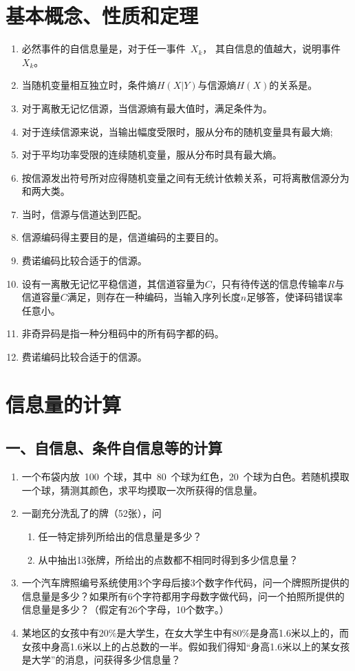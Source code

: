 \documentclass[normal,cyan]{elegantnote}
\newcommand{\nl}{\underline{\makebox[2em]{}}}
\begin{document}
\section*{基本概念、性质和定理}
\begin{enumerate}
    \item 必然事件的自信息量是\nl，对于任一事件~$X_k$， 其自信息的值越大，说明事件
    $X_k$\nl。
    \item 当随机变量相互独立时，条件熵$H(X|Y)$与信源熵$H(X)$的关系是\nl。
    \item 对于离散无记忆信源，当信源熵有最大值时，满足条件为\nl。
    \item 对于连续信源来说，当输出幅度受限时，服从\nl 分布的随机变量具有最大熵; 
    \item 对于平均功率受限的连续随机变量，服从\nl 分布时具有最大熵。
    \item 按信源发出符号所对应得随机变量之间有无统计依赖关系，可将离散信源分为\nl 和\nl 两大类。
    \item 当\nl 时，信源与信道达到匹配。
    \item 信源编码得主要目的是\nl，信道编码的主要目的\nl。
    \item 费诺编码比较合适于\nl 的信源。
    \item 设有一离散无记忆平稳信道，其信道容量为$C$，只有待传送的信息传输率$R$与信道容量$C$满足\nl，则存在一种编码，当输入序列长度$n$足够答，使译码错误率任意小。
    \item 非奇异码是指一种分租码中的所有码字都\nl 的码。
    \item 费诺编码比较合适于\nl 的信源。
\end{enumerate}
\section*{信息量的计算}
\subsection*{一、自信息、条件自信息等的计算}
\begin{enumerate}
    \item 一个布袋内放~100~个球，其中~80~个球为红色，20~个球为白色。若随机摸取一个球，猜测其颜色，求平均摸取一次所获得的信息量。
    \vspace*{0.8cm}
    \item 一副充分洗乱了的牌（52张），问
    \begin{enumerate}
        \item   任一特定排列所给出的信息量是多少？
        \item   从中抽出13张牌，所给出的点数都不相同时得到多少信息量？
    \end{enumerate}
    \vspace*{0.8cm}
    \item 一个汽车牌照编号系统使用3个字母后接3个数字作代码，问一个牌照所提供的信息量是多少？如果所有6个字符都用字母数字做代码，问一个拍照所提供的信息量是多少？（假定有26个字母，10个数字。）
    \vspace*{0.8cm}
    \item 某地区的女孩中有20\%是大学生，在女大学生中有80\%是身高1.6米以上的，而女孩中身高1.6米以上的占总数的一半。假如我们得知“身高1.6米以上的某女孩是大学”的消息，问获得多少信息量？
\end{enumerate}
\end{document}
